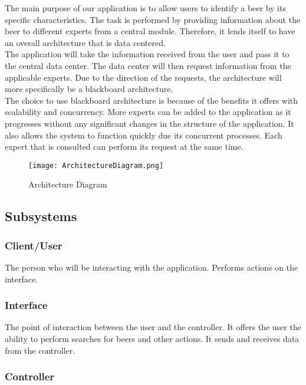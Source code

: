 \documentclass[]{article}
\begin{document}
The main purpose of our application is to allow users to identify a beer by its specific characteristics. The task is performed
by providing information about the beer to different experts from a central module. Therefore, it lends itself to have an overall
architecture that is data centered.\\


The application will take the information received from the user and pass it to the central data center. The data center will 
then request information from the applicable experts. Due to the direction of the requests, the architecture will more specifically 
be a blackboard architecture.\\


The choice to use blackboard architecture is because of the benefits it offers with scalability and concurrency. More experts can
be added to the application as it progresses without any significant changes in the structure of the application. It also 
allows the system to function quickly due its concurrent processes. Each expert that is consulted can perform its request at the
same time. 

\begin{figure}[h]
\caption{Architecture Diagram}
\centering
\texttt{[image: ArchitectureDiagram.png]}
\end{figure}



\subsection{Subsystems}
\label{sub:subsystems}
\subsubsection{Client/User}

The person who will be interacting with the application. Performs actions on the interface. 

\subsubsection{Interface} 

The point of interaction between the user and the controller. It offers the user the ability to perform
searches for beers and other actions. It sends and receives data from the controller.

\subsubsection{Controller} 
\end{document}
